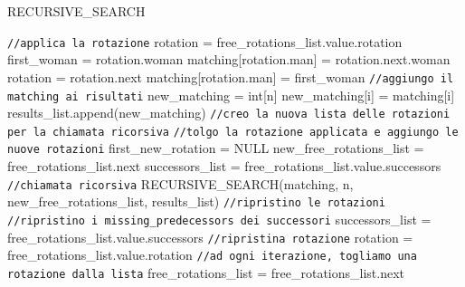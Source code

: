 \documentclass[12pt]{article}
\begin{document}
    \begin{algorithm}[H]
        \scriptsize
        \DontPrintSemicolon
        \caption{RECURSIVE\_SEARCH}\label{alg:RecursiveSearch}
        \;
         {
		\texttt{//applica la rotazione}\;
		rotation = free\_rotations\_list.value.rotation\;
		\;
		first\_woman = rotation.woman\;
		 {
			matching[rotation.man] = rotation.next.woman\;
			rotation = rotation.next\;
            }
		matching[rotation.man] = first\_woman\;
		\;
		\texttt{//aggiungo il matching ai risultati}\;
		new\_matching = int[n]\;
		 {
			new\_matching[i] = matching[i]\;
            }
		results\_list.append(new\_matching)\;
		\;
		\texttt{//creo la nuova lista delle rotazioni per la chiamata ricorsiva}\;
		\texttt{//tolgo la rotazione applicata e aggiungo le nuove rotazioni}\;
		first\_new\_rotation = NULL\;
            new\_free\_rotations\_list = free\_rotations\_list.next\;
            successors\_list = free\_rotations\_list.value.successors\;
            \;
		\texttt{//chiamata ricorsiva}\;
		RECURSIVE\_SEARCH(matching, n, new\_free\_rotations\_list, results\_list)\;
		\;
		\texttt{//ripristino le rotazioni}\;
		\texttt{//ripristino i missing\_predecessors dei successori}\;
		successors\_list = free\_rotations\_list.value.successors\;
            \;
		\texttt{//ripristina rotazione}\;
		rotation = free\_rotations\_list.value.rotation\;
            \;
		\texttt{//ad ogni iterazione, togliamo una rotazione dalla lista}\;
		free\_rotations\_list = free\_rotations\_list.next\;
        }
    \end{algorithm}
\end{document}
